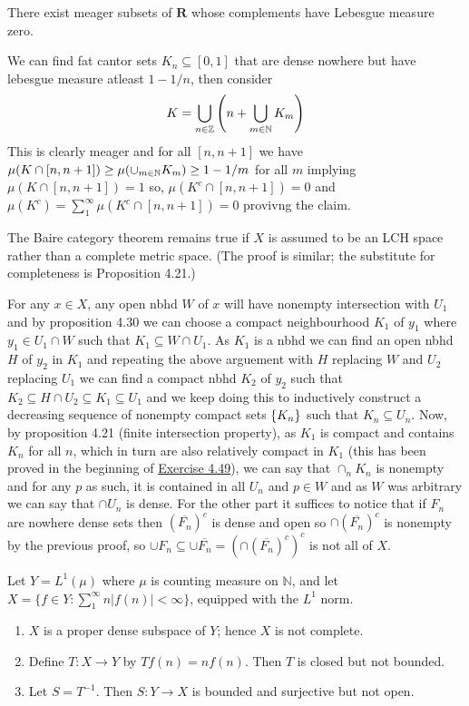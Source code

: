 \documentclass[12pt,a4paper]{article}
\begin{document}
\begin{problem}\label{prob:5-27}
There exist meager subsets of $\mathbf{R}$ whose complements have Lebesgue measure zero.
\end{problem}
\begin{solution}
We can find fat cantor sets $K_n \subseteq[0,1]$ that are dense nowhere but have lebesgue measure atleast $1-1/n$, then consider 
\[
    K=\bigcup_{n\in\mathbb{Z}}\qty(n+\bigcup_{m\in\mathbb{N}}K_m)
\]
This is clearly meager and for all $[n,n+1]$ we have $\mu(K\cap[n,n+1])\geq\mu(\cup_{m\in\mathbb{N}} K_m)\geq1-1/m$ for all $m$ implying $\mu(K\cap[n,n+1])=1$ so, $\mu(K^c\cap[n,n+1])=0$ and $\mu(K^c)=\sum_1^\infty\mu(K^c\cap[n,n+1])=0$ provivng the claim. 
\end{solution}
\begin{problem}\label{prob:5-28}
The Baire category theorem remains true if $X$ is assumed to be an LCH space rather than a complete metric space. (The proof is similar; the substitute for completeness is Proposition 4.21.)
\end{problem}
\begin{solution}
For any $x\in X$, any open nbhd $W$ of $x$ will have nonempty intersection with $U_1$ and by proposition 4.30 we can choose a compact neighbourhood $K_1$ of $y_1$ where $y_1\in U_1\cap W$ such that $K_1 \subseteq W\cap U_1.$ 
As $K_1$ is a nbhd we can find an open nbhd $H$ of $y_2$ in $K_1$ and repeating the above arguement with $H$ replacing $W$ and $U_2$ replacing $U_1$ we can find a compact nbhd $K_2$ of $y_2$ such that $K_2 \subseteq H\cap U_2 \subseteq K_1 \subseteq U_1$ and we keep doing this to inductively construct a decreasing sequence of nonempty compact sets $ \qty{K_n}$ such that $K_n \subseteq U_n$. 
Now, by proposition 4.21 (finite intersection property), as $K_1$ is compact and contains $K_n$ for all $n$, which in turn are also relatively compact in $K_1$ (this has been proved in the beginning of \hyperref[prob:4-49]{Exercise 4.49}), we can say that $\cap_nK_n$ is nonempty and for any $p$ as such, it is contained in all $U_n$ and $p\in W$ and as $W$ was arbitrary we can say that $\cap U_n$ is dense. 
For the other part it suffices to notice that if $F_n$ are nowhere dense sets then $( \overline{F_n})^c$ is dense and open so $\cap ( \overline{F_n})^c$ is nonempty by the previous proof, so $\cup F_n \subseteq\cup \overline{F_n} =(\cap (\overline{F_n})^c)^c$ is not all of $X.$ 
\end{solution}
\begin{problem}\label{prob:5-29}
Let $Y = L^1(\mu)$ where $\mu$ is counting measure on $\mathbb{N}$, and let $X = \{f \in Y : \sum_{1}^{\infty} n|f(n)| < \infty\}$, equipped with the $L^1$ norm.
\begin{enumerate}[label=\alph*.]
\item $X$ is a proper dense subspace of $Y$; hence $X$ is not complete.
\item Define $T : X \rightarrow Y$ by $Tf(n) = n f(n)$. Then $T$ is closed but not bounded.
\item Let $S = T^{-1}$. Then $S : Y \rightarrow X$ is bounded and surjective but not open.
\end{enumerate}
\end{problem}
\end{document}
